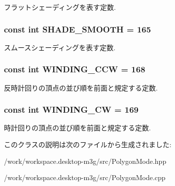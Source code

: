 フラットシェーディングを表す定数. \hypertarget{classm3g_1_1PolygonMode_2da5e6696c8e910d9fca74b583a081df}{
\subsubsection[{SHADE\_\-SMOOTH}]{\setlength{\rightskip}{0pt plus 5cm}const int {\bf SHADE\_\-SMOOTH} = 165}}
\label{classm3g_1_1PolygonMode_2da5e6696c8e910d9fca74b583a081df}


スムースシェーディングを表す定数. \hypertarget{classm3g_1_1PolygonMode_98d881cf813edf483860268535014210}{
\subsubsection[{WINDING\_\-CCW}]{\setlength{\rightskip}{0pt plus 5cm}const int {\bf WINDING\_\-CCW} = 168}}
\label{classm3g_1_1PolygonMode_98d881cf813edf483860268535014210}


反時計回りの頂点の並び順を前面と規定する定数. \hypertarget{classm3g_1_1PolygonMode_86975b3dec0d6cc20f54fd82eb13ef9e}{
\subsubsection[{WINDING\_\-CW}]{\setlength{\rightskip}{0pt plus 5cm}const int {\bf WINDING\_\-CW} = 169}}
\label{classm3g_1_1PolygonMode_86975b3dec0d6cc20f54fd82eb13ef9e}


時計回りの頂点の並び順を前面と規定する定数. 

このクラスの説明は次のファイルから生成されました:\begin{CompactItemize}
\item 
/work/workspace.desktop-m3g/src/PolygonMode.hpp\item 
/work/workspace.desktop-m3g/src/PolygonMode.cpp\end{CompactItemize}
